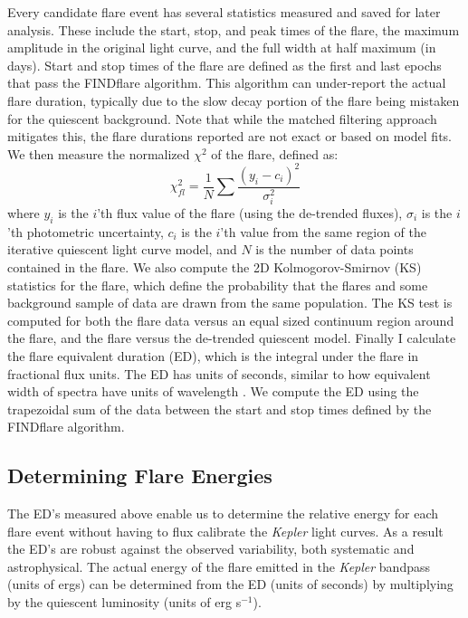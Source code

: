 \documentclass[twocolumn]{aastex6}
\newcommand{\Kepler}{\textsl{Kepler}\xspace}
\begin{document}
Every candidate flare event has several statistics measured and saved for later analysis. These include the start, stop, and peak times of the flare, the maximum amplitude in the original light curve, and the full width at half maximum (in days).
Start and stop times of the flare are defined as the first and last epochs that pass the FINDflare algorithm. This algorithm can under-report the actual flare duration, typically due to the slow decay portion of the flare being mistaken for the quiescent background. Note that while the matched filtering approach mitigates this, the flare durations reported are not exact or based on model fits.
We then measure the normalized $\chi^2$ of the flare, defined as:
\begin{equation}
\chi^2_{fl} = \frac{1}{N}\sum\frac{(y_i - c_i)^2}{\sigma_i^2}
\label{eqn:chisq}
\end{equation}
where $y_i$ is the $i$'th flux value of the flare (using the de-trended fluxes), 
$\sigma_i$ is the $i$'th photometric uncertainty, 
$c_i$ is the $i$'th value from the same region of the iterative quiescent light curve model, 
and $N$ is the number of data points contained in the flare. We also compute the 2D Kolmogorov-Smirnov (KS) statistics for the flare, which define the probability that the flares and some background sample of data are drawn from the same population. The KS test is computed for both the flare data versus an equal sized continuum region around the flare, and the flare versus the de-trended quiescent model. Finally I calculate the flare equivalent duration (ED), which is the integral under the flare in fractional flux units. The ED has units of seconds, similar to how equivalent width of spectra have units of wavelength \citep[e.g. see][]{huntwalker2012}. We compute the ED using the trapezoidal sum of the data between the start and stop times defined by the FINDflare algorithm.


\subsection{Determining Flare Energies}
\label{sec:find3}

The ED's measured above enable us to determine the relative energy for each flare event without having to flux calibrate the \Kepler light curves. As a result the ED's are robust against the observed variability, both systematic and astrophysical. The actual energy of the flare emitted in the \Kepler bandpass (units of ergs) can be determined from the ED (units of seconds) by multiplying by the quiescent luminosity (units of erg s$^{-1}$).
\end{document}
